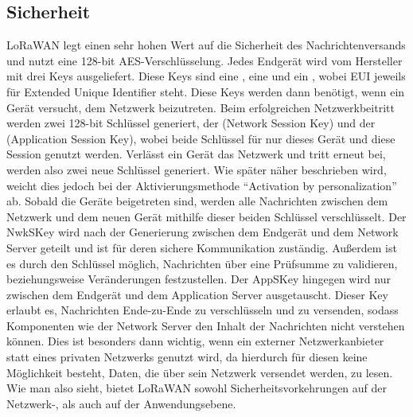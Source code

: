 \subsection{Sicherheit}
\label{sec:ThHi:sicherheit}

LoRaWAN legt einen sehr hohen Wert auf die Sicherheit des Nachrichtenversands und nutzt eine 128-bit AES-Verschlüsselung. Jedes Endgerät wird vom Hersteller mit drei Keys ausgeliefert. Diese Keys sind eine , eine  und ein , wobei EUI jeweils für Extended Unique Identifier steht. Diese Keys werden dann benötigt, wenn ein Gerät versucht, dem Netzwerk beizutreten. Beim erfolgreichen Netzwerkbeitritt werden zwei 128-bit Schlüssel generiert, der  (Network Session Key) und der  (Application Session Key), wobei beide Schlüssel für nur dieses Gerät und diese Session genutzt werden. Verlässt ein Gerät das Netzwerk und tritt erneut bei, werden also zwei neue Schlüssel generiert. Wie später näher beschrieben wird, weicht dies jedoch bei der Aktivierungsmethode ``Activation by personalization'' ab. Sobald die Geräte beigetreten sind, werden alle Nachrichten zwischen dem Netzwerk und dem neuen Gerät mithilfe dieser beiden Schlüssel verschlüsselt. Der NwkSKey wird nach der Generierung zwischen dem Endgerät und dem Network Server geteilt und ist für deren sichere Kommunikation zuständig. Außerdem ist es durch den Schlüssel möglich, Nachrichten über eine Prüfsumme zu validieren, beziehungsweise Veränderungen festzustellen. Der AppSKey hingegen wird nur zwischen dem Endgerät und dem Application Server ausgetauscht. Dieser Key erlaubt es, Nachrichten Ende-zu-Ende zu verschlüsseln und zu versenden, sodass Komponenten wie der Network Server den Inhalt der Nachrichten nicht verstehen können. Dies ist besonders dann wichtig, wenn ein externer Netzwerkanbieter statt eines privaten Netzwerks genutzt wird, da hierdurch für diesen keine Möglichkeit besteht, Daten, die über sein Netzwerk versendet werden, zu lesen. Wie man also sieht, bietet LoRaWAN sowohl Sicherheitsvorkehrungen auf der Netzwerk-, als auch auf der Anwendungsebene.

